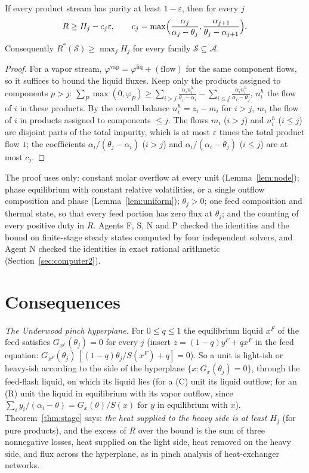 \begin{corollary}\label{cor:purity}
If every product stream has purity at least $1-\varepsilon$, then for every $j$
\[R\ge H_j-c_j\varepsilon,\qquad c_j=\max\Bigl(\frac{\alpha_j}{\alpha_j-\theta_j},\frac{\alpha_{j+1}}{\theta_j-\alpha_{j+1}}\Bigr).\]
Consequently $R^*(\mathcal S)\ge\max_jH_j$ for every family $\mathcal S\subseteq\mathcal A$.
\end{corollary}
\begin{proof}
For a vapor stream, $\varphi^{\mathrm{vap}}=\varphi^{\mathrm{liq}}+(\text{flow})$ for the same component flows, so it suffices to
bound the liquid fluxes. Keep only the products assigned to components $p>j$:
$\sum_P\max(0,\varphi_P)\ge\sum_{i>j}\frac{\alpha_in^h_i}{\theta_j-\alpha_i}-\sum_{i\le j}\frac{\alpha_in^h_i}{\alpha_i-\theta_j}$,
$n^h_i$ the flow of $i$ in these products. By the overall balance $n^h_i=z_i-m_i$ for $i>j$, $m_i$ the flow of $i$ in
products assigned to components $\le j$. The flows $m_i$ ($i>j$) and $n^h_i$ ($i\le j$) are disjoint parts of the total
impurity, which is at most $\varepsilon$ times the total product flow $1$; the coefficients $\alpha_i/(\theta_j-\alpha_i)$ ($i>j$)
and $\alpha_i/(\alpha_i-\theta_j)$ ($i\le j$) are at most $c_j$.
\end{proof}

\noindent The proof uses only: constant molar overflow at every unit (Lemma~\ref{lem:node}); phase equilibrium with
constant relative volatilities, or a single outflow composition and phase (Lemma~\ref{lem:uniform}); $\theta_j>0$; one
feed composition and thermal state, so that every feed portion has zero flux at $\theta_j$; and the counting of every
positive duty in $R$. Agents F, S, N and P checked the identities and the bound on finite-stage steady states computed
by four independent solvers, and Agent N checked the identities in exact rational arithmetic
(Section~\ref{sec:computer2}).

\section{Consequences}\label{sec:conseq}

\emph{The Underwood pinch hyperplane.} For $0\le q\le1$ the equilibrium liquid $x^F$ of the feed satisfies
$G_{x^F}(\theta_j)=0$ for every $j$ (insert $z=(1-q)y^F+qx^F$ in the feed equation: $G_{x^F}(\theta_j)\,[(1-q)\theta_j/S(x^F)+q]=0$).
So a unit is light-ish or heavy-ish according to the side of the hyperplane $\{x:G_x(\theta_j)=0\}$, through the feed-flash
liquid, on which its liquid lies (for a (C) unit its liquid outflow; for an (R) unit the liquid in equilibrium with its
vapor outflow, since $\sum_iy_i/(\alpha_i-\theta)=G_x(\theta)/S(x)$ for $y$ in equilibrium with $x$). Theorem~\ref{thm:stage} says: \emph{the heat
supplied to the heavy side is at least $H_j$} (for pure products), and the excess of $R$ over the bound is the sum of three nonnegative
losses, heat supplied on the light side, heat removed on the heavy side, and flux across the hyperplane, as in pinch
analysis of heat-exchanger networks.

